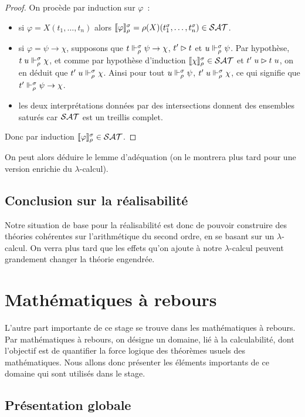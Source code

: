 \documentclass{article}
\begin{document}
\begin{proof}
  On procède par induction sur $\varphi$~:
  \begin{itemize}
  \item si $\varphi = X(t_1,\ldots,t_n)$ alors $\llbracket \varphi \rrbracket_\rho^\sigma=\rho(X)(t_1^\sigma,\ldots,t_n^\sigma)\in \mathcal {SAT}$.
  \item si $\varphi = \psi \to \chi$, supposons que $t\Vdash_\rho^\sigma \psi \to \chi$, $t'\rhd t$ et $u\Vdash_\rho^\sigma\psi$. Par hypothèse, $t\;u\Vdash_\rho^\sigma \chi$, et comme par hypothèse d'induction $\llbracket \chi \rrbracket_\rho^\sigma\in\mathcal {SAT}$ et $t'\;u\rhd t\;u$, on en déduit que $t'\;u\Vdash_\rho^\sigma \chi$. Ainsi pour tout $u\Vdash_\rho^\sigma\psi$, $t'\;u\Vdash_\rho^\sigma\chi$, ce qui signifie que $t'\Vdash_\rho^\sigma\psi\to\chi$.
  \item les deux interprétations données par des intersections donnent des ensembles saturés car $\mathcal {SAT}$ est un treillis complet.
  \end{itemize}
  Donc par induction $\llbracket \varphi \rrbracket_\rho^\sigma\in\mathcal {SAT}$.
\end{proof}

On peut alors déduire le lemme d'adéquation (on le montrera plus tard pour une version enrichie du $\lambda$-calcul).

\subsection{Conclusion sur la réalisabilité}

Notre situation de base pour la réalisabilité est donc de pouvoir construire des théories cohérentes sur l'arithmétique du second ordre, en se basant sur un $\lambda$-calcul. On verra plus tard que les effets qu'on ajoute à notre $\lambda$-calcul peuvent grandement changer la théorie engendrée.

\section{Mathématiques à rebours}

L'autre part importante de ce stage se trouve dans les mathématiques à rebours. Par mathématiques à rebours, on désigne un domaine, lié à la calculabilité, dont l'objectif est de quantifier la force logique des théorèmes usuels des mathématiques. Nous allons donc présenter les éléments importants de ce domaine qui sont utilisés dans le stage.

\subsection{Présentation globale}
\end{document}
